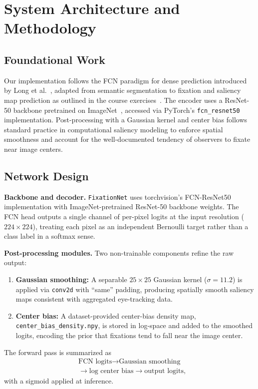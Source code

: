 \documentclass[conference]{IEEEtran}
\begin{document}
\section{System Architecture and Methodology}

\subsection{Foundational Work}
Our implementation follows the FCN paradigm for dense prediction introduced by Long et al.~\cite{long2015fcn}, adapted from semantic segmentation to fixation and saliency map prediction as outlined in the course exercises~\cite{course2026}. The encoder uses a ResNet-50 backbone pretrained on ImageNet~\cite{he2016resnet}, accessed via PyTorch's \texttt{fcn\_resnet50} implementation. Post-processing with a Gaussian kernel and center bias follows standard practice in computational saliency modeling to enforce spatial smoothness and account for the well-documented tendency of observers to fixate near image centers.

\subsection{Network Design}
\textbf{Backbone and decoder.} \texttt{FixationNet} uses torchvision's FCN-ResNet50 implementation with ImageNet-pretrained ResNet-50 backbone weights. The FCN head outputs a single channel of per-pixel logits at the input resolution ($224\times224$), treating each pixel as an independent Bernoulli target rather than a class label in a softmax sense.

\textbf{Post-processing modules.} Two non-trainable components refine the raw output:
\begin{enumerate}[leftmargin=*]
    \item \textbf{Gaussian smoothing:} A separable $25\times25$ Gaussian kernel ($\sigma=11.2$) is applied via \texttt{conv2d} with ``same'' padding, producing spatially smooth saliency maps consistent with aggregated eye-tracking data.
    \item \textbf{Center bias:} A dataset-provided center-bias density map, \texttt{center\_bias\_density.npy}, is stored in log-space and added to the smoothed logits, encoding the prior that fixations tend to fall near the image center.
\end{enumerate}

The forward pass is summarized as
\[
\begin{aligned}
&\text{FCN logits} \rightarrow \text{Gaussian smoothing}\\
&\rightarrow \text{log center bias} \rightarrow \text{output logits},
\end{aligned}
\]
with a sigmoid applied at inference.
\end{document}
